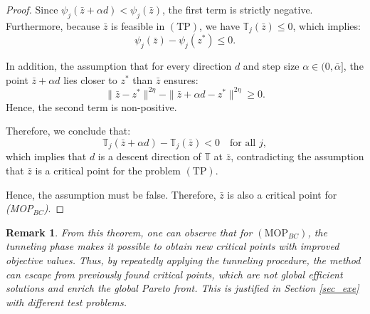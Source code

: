 \documentclass[amsa]{ipart}
\theoremstyle{plain}
\newtheorem{remark}{Remark}%
\numberwithin{equation}{section}
\newcommand{\xlm}{z^*}                    %
\newcommand{\obj}[1]{\psi_{#1}}               %
\newcommand{\tun}{\boldsymbol{\mathbb{T}}}                 %
\newcommand{\tunobj}[1]{\mathbb{T}_{#1}}               %
\begin{document}
\begin{proof}



Since $\obj{j}(\bar{z} + \alpha d) < \obj{j}(\bar{z})$, the first term is strictly negative.  
Furthermore, because $\bar{z}$ is feasible in $(\mathrm{TP})$, we have \(\tunobj{j}(\bar{z}) \leq 0\), which implies:
$$\obj{j}(\bar{z}) - \obj{j}(\xlm) \leq 0.$$

In addition, the assumption that for every direction $d$ and step size $\alpha \in (0, \bar{\alpha}]$, 
the point $\bar{z} + \alpha d$ lies closer to $\xlm$ than $\bar{z}$ ensures:
\[
\| \bar{z} - \xlm \|^{2\eta} - \| \bar{z} + \alpha d - \xlm \|^{2\eta} \geq 0.
\]
Hence, the second term is non-positive.

Therefore, we conclude that:
\[
\tunobj{j}(\bar{z} + \alpha d) - \tunobj{j}(\bar{z}) < 0 \quad \text{for all } j,
\]
which implies that \(d\) is a descent direction of $\tun$ at $\bar{z}$, contradicting the assumption that \(\bar{z}\) is a critical point for the problem $(\mathrm{TP})$.

Hence, the assumption must be false. Therefore, $\bar{z}$ is also a critical point for \emph{(MOP\(_{BC}\))}.
\end{proof}
\begin{remark}
    From this theorem, one can observe that for $(\mathrm{MOP}_{BC})$, the tunneling phase makes it possible to obtain new critical points with improved objective values. Thus, by repeatedly applying the tunneling procedure, the method can escape from previously found critical points, which are not global efficient solutions and enrich the global Pareto front. This is justified in Section \ref{sec_exe} with different test problems.
\end{remark}
\end{document}
